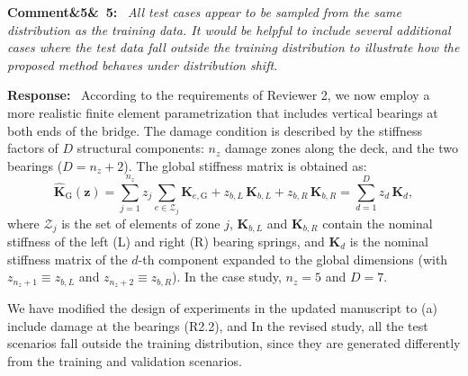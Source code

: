 \documentclass[11pt]{article}
\newenvironment{rcomment}[1]{\par\bigskip\noindent\textbf{Comment\ifx&#1&\else\ #1\fi:}\ \itshape}{\par}
\newenvironment{response}{\par\smallskip\noindent\color{resp}\textbf{Response:}\ }{\par}
\newcommand{\z}{\mathbf{z}}
\begin{document}
\begin{rcomment}{5}
All test cases appear to be sampled from the same distribution as the training data. It would be helpful to include several additional cases where the test data fall outside the training distribution to illustrate how the proposed method behaves under distribution shift.
\end{rcomment}

\begin{response}
According to the requirements of Reviewer 2, we now employ a more realistic finite element  parametrization that includes vertical bearings at both ends of the bridge. 
The damage condition is described by the stiffness factors of $D$ structural components: $n_z$ damage zones along the deck, and the two bearings ($D=n_z+2$). 
The global stiffness matrix is obtained as:
\begin{equation}
	\hat{\mathbf{K}}_{\mathrm{G}}(\z)=\sum_{j=1}^{n_z} z_j\sum_{e\in\mathcal{Z}_j}\mathbf{K}_{e,\mathrm{G}}
	+z_{b,L}\,\mathbf{K}_{b,L}+z_{b,R}\,\mathbf{K}_{b,R}=\sum_{d=1}^{D}z_d\,\mathbf{K}_d,
	\label{eq:Kz}
\end{equation}
where $\mathcal{Z}_j$ is the set of elements of zone $j$, $\mathbf{K}_{b,L}$ and $\mathbf{K}_{b,R}$ contain the nominal stiffness of the left (L) and right (R) bearing springs, and $\mathbf{K}_d$ is the nominal stiffness matrix of the $d$-th
component expanded to the global dimensions (with $z_{n_z+1}\equiv z_{b,L}$ and $z_{n_z+2}\equiv z_{b,R}$). In the case
study, $n_z=5$ and $D=7$.


We have modified the design of experiments in the updated manuscript to (a) include damage at the bearings (R2.2), and 	
In the revised study, all the test scenarios fall outside the training distribution, since they are generated differently from the training and validation scenarios.
 

\end{response}
\end{document}
